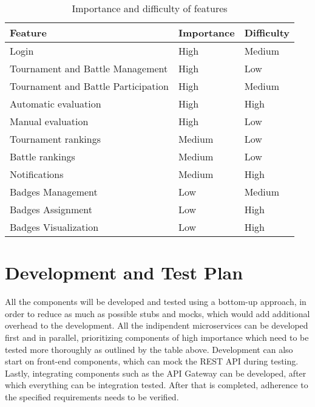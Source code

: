 \begin{table}[H]
    \centering
    \begin{tabular}{|l|l|l|}
        \hline
        \textbf{Feature}                    & \textbf{Importance} & \textbf{Difficulty} \\\hline
        Login                               & High                & Medium              \\
        Tournament and Battle Management    & High                & Low                 \\
        Tournament and Battle Participation & High                & Medium              \\
        Automatic evaluation                & High                & High                \\
        Manual evaluation                   & High                & Low                 \\
        Tournament rankings                 & Medium              & Low                 \\
        Battle rankings                     & Medium              & Low                 \\
        Notifications                       & Medium              & High                \\
        Badges Management                   & Low                 & Medium              \\
        Badges Assignment                   & Low                 & High                \\
        Badges Visualization                & Low                 & High                \\\hline
    \end{tabular}
    \caption{Importance and difficulty of features}
    \label{table:Importance and difficulty of features}
\end{table}

\section{Development and Test Plan}
All the components will be developed and tested using a bottom-up approach, in order to reduce as
much as possible stubs and mocks, which would add additional overhead to the development.
All the indipendent microservices can be developed first and in parallel, prioritizing components
of high importance which need to be tested more thoroughly as outlined by the table above.
Development can also start on front-end components, which can mock the REST API during testing.
Lastly, integrating components such as the API Gateway can be developed, after which everything
can be integration tested. After that is completed, adherence to the specified requirements
needs to be verified.

